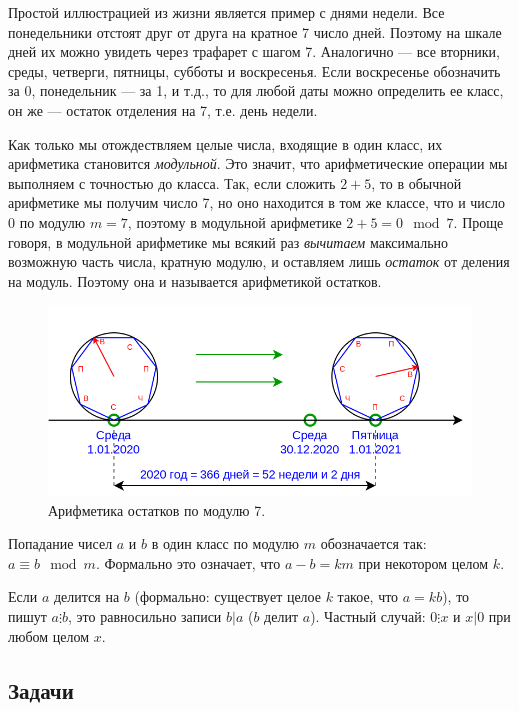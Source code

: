 Простой иллюстрацией из жизни является пример с днями недели. Все понедельники отстоят друг от друга на кратное 7 число дней. Поэтому на шкале дней их можно увидеть через трафарет с шагом 7. Аналогично --- все вторники, среды, четверги, пятницы, субботы и воскресенья. Если воскресенье обозначить за 0, понедельник --- за 1, и т.д., то для любой даты можно определить ее класс, он же --- остаток отделения на 7, т.е. день недели.

Как только мы отождествляем целые числа, входящие в один класс, их арифметика становится \textit{модульной}. Это значит, что арифметические операции мы выполняем с точностью до класса. Так, если сложить $2+5$, то в обычной арифметике мы получим число 7, но оно находится в том же классе, что и число 0 по модулю $m=7$, поэтому в модульной арифметике $2+5=0\mod 7$. Проще говоря, в модульной арифметике мы всякий раз \textit{вычитаем} максимально возможную часть числа, кратную модулю, и оставляем лишь \textit{остаток} от деления на модуль. Поэтому она и называется арифметикой остатков.

\begin{figure}[hbt!]
\begin{center}
\includegraphics[scale=0.4]{../weekdays.png}
\end{center}
\caption{Арифметика остатков по модулю 7.}\label{weekdays}
\end{figure}

Попадание чисел $a$ и $b$ в один класс по модулю $m$ обозначается так: $a\equiv b\mod m$. Формально это означает, что $a-b=km$ при некотором целом $k$.


Если $a$ делится на $b$ (формально: существует целое $k$ такое, что $a=kb$), то пишут $a\vdots b$, это равносильно записи $b|a$ ($b$ делит $a$). Частный случай: $0\vdots x$ и $x|0$ при любом целом $x$.

\subsection*{Задачи}


